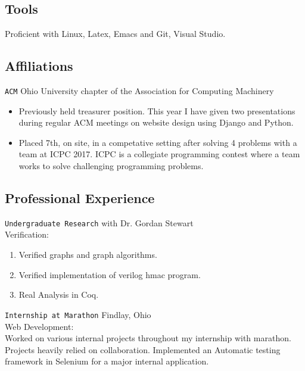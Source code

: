 \documentclass[11pt]{article} %
\begin{document}
\subsection*{Tools}
Proficient with Linux, Latex, Emacs and Git, Visual Studio.


\subsection*{Affiliations}
\texttt{ACM} Ohio University chapter of the Association for Computing Machinery
\begin{itemize}
\item Previously held treasurer position. This year I have given two presentations during regular ACM meetings on website design using Django and Python.
\item Placed 7th, on site, in a competative setting after solving 4 problems with a team at ICPC 2017. ICPC is a collegiate programming contest where a team works to solve challenging programming problems. 
\end{itemize}
\subsection*{Professional Experience} 
\texttt{Undergraduate Research} with Dr. Gordan Stewart \\
Verification: \\
\begin{enumerate}
\item Verified graphs and graph algorithms.
\item Verified implementation of verilog hmac program.
\item Real Analysis in Coq.
\end{enumerate}


\noindent \texttt{Internship at Marathon} Findlay, Ohio \\
Web Development: \\
Worked on various internal projects throughout my internship with marathon.  Projects heavily relied on collaboration.  Implemented an Automatic testing framework in Selenium for a major internal application.
           
\end{document}
